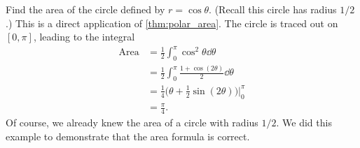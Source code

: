 \begin{example}\label{ex_polcalc3}
Find the area of the circle defined by $r=\cos \theta$. (Recall this circle has radius $1/2$.)
\solution
This is a direct application of \autoref{thm:polar_area}. The circle is traced out on $[0,\pi]$, leading to the integral
%
%
\begin{align*}
	\text{Area} &= \frac12\int_0^\pi \cos^2\theta\dd\theta \\
	&= \frac12\int_0^\pi \frac{1+\cos(2\theta)}{2}\dd\theta\\
	&= \frac14\bigl(\theta +\frac12\sin(2\theta)\bigr)\Bigg|_0^\pi\\
	&= \frac\pi4.
\end{align*}
Of course, we already knew the area of a circle with radius $1/2$. We did this example to demonstrate that the area formula is correct.
\end{example}

